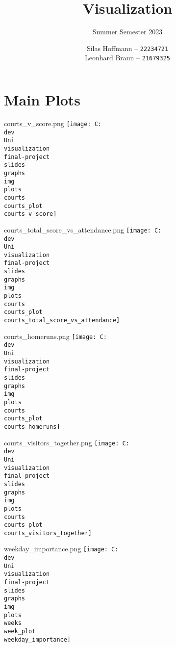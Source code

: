\documentclass[pdf]{beamer}
\title{Visualization}
\subtitle{Summer Semester 2023}
\author{
    Silas Hoffmann --
    \texttt{22234721} \\
    Leonhard Braun --
    \texttt{21679325} \\
}
\institute{Georg-August-Universität Göttingen}
\begin{document}
\maketitle

\section{Main Plots}
\begin{frame}{courts\_v\_score.png}
	\centering
	\texttt{[image: C:\\dev\\Uni\\visualization\\final-project\\slides\\graphs\\img\\plots\\courts\\courts\_plot\\courts\_v\_score]}
\end{frame}
\begin{frame}{courts\_total\_score\_vs\_attendance.png}
	\centering
	\texttt{[image: C:\\dev\\Uni\\visualization\\final-project\\slides\\graphs\\img\\plots\\courts\\courts\_plot\\courts\_total\_score\_vs\_attendance]}
\end{frame}
\begin{frame}{courts\_homeruns.png}
	\centering
	\texttt{[image: C:\\dev\\Uni\\visualization\\final-project\\slides\\graphs\\img\\plots\\courts\\courts\_plot\\courts\_homeruns]}
\end{frame}
\begin{frame}{courts\_visitors\_together.png}
	\centering
	\texttt{[image: C:\\dev\\Uni\\visualization\\final-project\\slides\\graphs\\img\\plots\\courts\\courts\_plot\\courts\_visitors\_together]}
\end{frame}
\begin{frame}{weekday\_importance.png}
	\centering
	\texttt{[image: C:\\dev\\Uni\\visualization\\final-project\\slides\\graphs\\img\\plots\\weeks\\week\_plot\\weekday\_importance]}
\end{frame}
\end{document}
